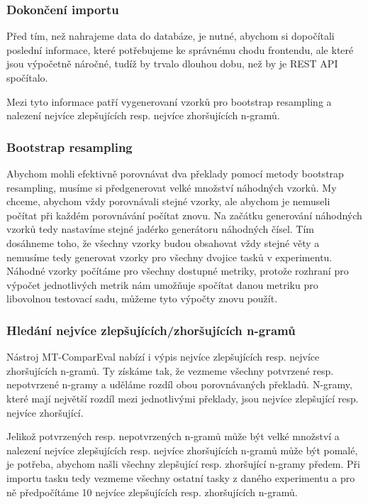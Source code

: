 \subsubsection{Dokončení importu}
Před tím, než nahrajeme data do databáze, je nutné,
  abychom si dopočítali poslední informace,
  které potřebujeme ke správnému chodu frontendu,
  ale které jsou výpočetně náročné,
  tudíž by trvalo dlouhou dobu,
  než by je REST API spočítalo.

Mezi tyto informace patří vygenerovaní vzorků pro bootstrap resampling a
  nalezení nejvíce zlepšujících resp. nejvíce zhoršujících n-gramů.

\subsubsection{Bootstrap resampling}
Abychom mohli efektivně porovnávat dva překlady pomocí metody bootstrap resampling,
  musíme si předgenerovat velké množství náhodných vzorků.
My chceme,
  abychom vždy porovnávali stejné vzorky,
  ale abychom je nemuseli počítat při každém porovnávání počítat znovu.
Na začátku generování náhodných vzorků tedy nastavíme stejné jadérko generátoru náhodných čísel.
Tím dosáhneme toho,
  že všechny vzorky budou obsahovat vždy stejné věty
  a nemusíme tedy generovat vzorky pro všechny dvojice tasků v experimentu.
Náhodné vzorky počítáme pro všechny dostupné metriky,
  protože rozhraní pro výpočet jednotlivých metrik nám umožňuje spočítat danou metriku pro libovolnou testovací sadu,
  můžeme tyto výpočty znovu použít.


\subsubsection{Hledání nejvíce zlepšujících/zhoršujících n-gramů}
Nástroj MT-ComparEval nabízí i výpis nejvíce zlepšujících resp. nejvíce zhoršujících n-gramů.
Ty získáme tak, že vezmeme všechny potvrzené resp. nepotvrzené n-gramy
  a uděláme rozdíl obou porovnávaných překladů.
N-gramy,
  které mají největší rozdíl mezi jednotlivými překlady,
  jsou nejvíce zlepšující resp. nejvíce zhoršující.

Jelikož potvrzených resp. nepotvrzených n-gramů může být velké množství
  a nalezení nejvíce zlepšujících resp. nejvíce zhoršujících n-gramů může být pomalé,
  je potřeba,
  abychom našli všechny zlepšující resp. zhoršující n-gramy předem.
Při importu tasku tedy vezmeme všechny ostatní tasky z daného experimentu
  a pro ně předpočítáme 10 nejvíce zlepšujících resp. zhoršujících n-gramů. 

